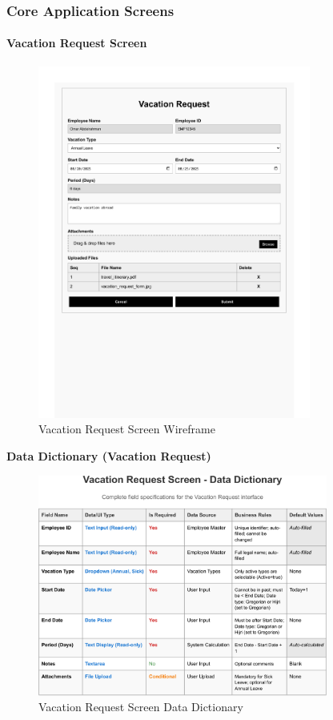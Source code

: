 \documentclass[12pt,a4paper]{article}
\begin{document}
\subsubsection{Core Application Screens}

\paragraph{Vacation Request Screen}
\begin{figure}[H]
\centering
\includegraphics[width=0.8\textwidth]{Wireframes/Vacation-Request/Vacation-Request-1.png}
\caption{Vacation Request Screen Wireframe}
\label{fig:wireframe-vacation-request}
\end{figure}

\noindent\textbf{Data Dictionary (Vacation Request)}
\begin{figure}[H]
\centering
\includegraphics[width=0.85\textwidth]{Data-Dictionary/Screen-Data-Dictionaries/Vacation-Request-Screen-Data-Dictionary/Vacation-Request-Screen-Data-Dictionary-1.png}
\caption{Vacation Request Screen Data Dictionary}
\label{fig:vacation-request-data-dict-inline}
\end{figure}
\end{document}
